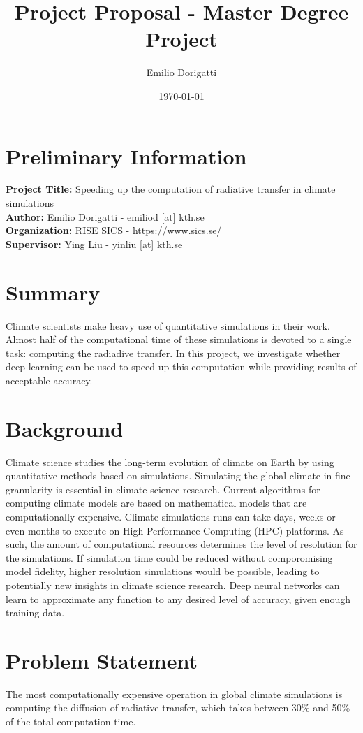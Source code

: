 \documentclass[11pt]{article}
\author{Emilio Dorigatti}
\date{\today}
\title{Project Proposal - Master Degree Project}
\begin{document}
\maketitle

\section{Preliminary Information}
\label{sec:org2dc2040}
\textbf{\textbf{Project Title:}} Speeding up the computation of radiative transfer in climate simulations \\
\textbf{\textbf{Author:}} Emilio Dorigatti - emiliod [at] kth.se \\
\textbf{\textbf{Organization:}} RISE SICS - \url{https://www.sics.se/} \\
\textbf{\textbf{Supervisor:}} Ying Liu - yinliu [at] kth.se

\section{Summary}
\label{sec:org25b2646}
Climate scientists make heavy use of quantitative simulations in their work. Almost half of the computational time of these simulations is devoted to a single task: computing the radiadive transfer. In this project, we investigate whether deep learning can be used to speed up this computation while providing results of acceptable accuracy.

\section{Background}
\label{sec:org24bf353}
Climate science studies the long-term evolution of climate on Earth by using quantitative methods based on simulations. Simulating the global climate in fine granularity is essential in climate science research. Current algorithms for computing climate models are based on mathematical models that are computationally expensive. Climate simulations runs can take days, weeks or even months to execute on High Performance Computing (HPC) platforms. As such, the amount of computational resources determines the level of resolution for the simulations. If simulation time could be reduced without comporomising model fidelity, higher resolution simulations would be possible, leading to potentially new insights in climate science research.
Deep neural networks can learn to approximate any function to any desired level of accuracy, given enough training data.

\section{Problem Statement}
\label{sec:org17e84f8}
The most computationally expensive operation in global climate simulations is computing the diffusion of radiative transfer, which takes between 30\% and 50\% of the total computation time.
\end{document}
